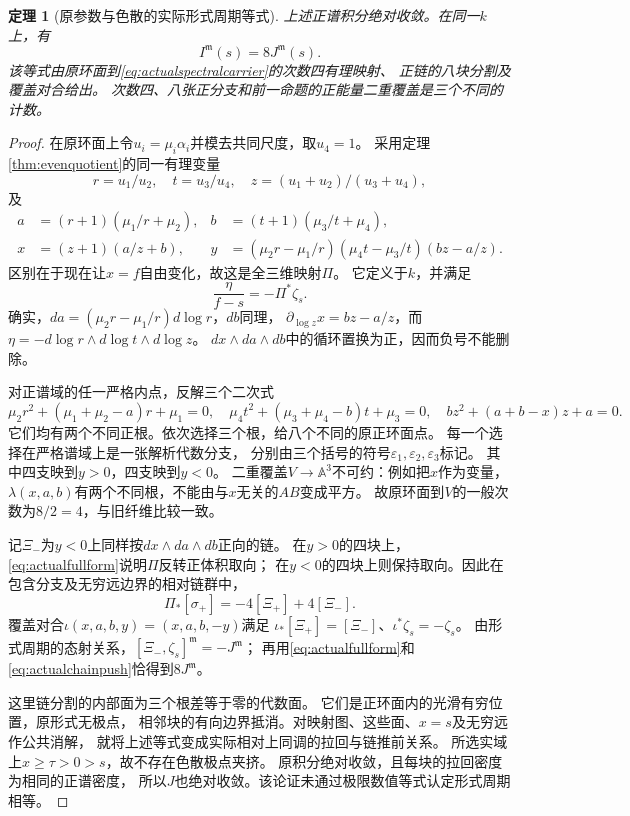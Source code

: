 \documentclass[11pt,a4paper]{ctexart}
\theoremstyle{cnplain}\newtheorem{theorem}{定理}[section]
\theoremstyle{definition}\newtheorem{definition}[theorem]{定义}
\theoremstyle{remark}\newtheorem{remark}[theorem]{注}
\begin{document}
\begin{theorem}[原参数与色散的实际形式周期等式]\label{thm:actualdispersionformal}
上述正谱积分绝对收敛。在同一$k$上，有
\begin{equation}\label{eq:actualeight}
                   I^{\mathfrak m}(s)=8J^{\mathfrak m}(s).
\end{equation}
该等式由原环面到\eqref{eq:actualspectralcarrier}的次数四有理映射、
正链的八块分割及覆盖对合给出。
次数四、八张正分支和前一命题的正能量二重覆盖是三个不同的计数。
\end{theorem}
\begin{proof}
在原环面上令$u_i=\mu_i\alpha_i$并模去共同尺度，取$u_4=1$。
采用定理\ref{thm:evenquotient}的同一有理变量
\[
 r=u_1/u_2,\quad t=u_3/u_4,\quad z=(u_1+u_2)/(u_3+u_4),
\]
及
\begin{align*}
 a&=(r+1)(\mu_1/r+\mu_2),&
 b&=(t+1)(\mu_3/t+\mu_4),\\
 x&=(z+1)(a/z+b),&
 y&=(\mu_2r-\mu_1/r)(\mu_4t-\mu_3/t)(bz-a/z).
\end{align*}
区别在于现在让$x=f$自由变化，故这是全三维映射$\Pi$。
它定义于$k$，并满足
\begin{equation}\label{eq:actualfullform}
             \frac{\eta}{f-s}=-\Pi^*\zeta_s.
\end{equation}
确实，$da=(\mu_2r-\mu_1/r)d\log r$，$db$同理，
$\partial_{\log z}x=bz-a/z$，而
$\eta=-d\log r\wedge d\log t\wedge d\log z$。
$dx\wedge da\wedge db$中的循环置换为正，因而负号不能删除。

对正谱域的任一严格内点，反解三个二次式
\[
 \mu_2r^2+(\mu_1+\mu_2-a)r+\mu_1=0,\quad
 \mu_4t^2+(\mu_3+\mu_4-b)t+\mu_3=0,\quad
 bz^2+(a+b-x)z+a=0.
\]
它们均有两个不同正根。依次选择三个根，给八个不同的原正环面点。
每一个选择在严格谱域上是一张解析代数分支，
分别由三个括号的符号$\varepsilon_1,\varepsilon_2,\varepsilon_3$标记。
其中四支映到$y>0$，四支映到$y<0$。
二重覆盖$V\to\mathbb A^3$不可约：例如把$x$作为变量，
$\lambda(x,a,b)$有两个不同根，不能由与$x$无关的$AB$变成平方。
故原环面到$V$的一般次数为$8/2=4$，与旧纤维比较一致。

记$\Xi_-$为$y<0$上同样按$dx\wedge da\wedge db$正向的链。
在$y>0$的四块上，\eqref{eq:actualfullform}说明$\Pi$反转正体积取向；
在$y<0$的四块上则保持取向。因此在包含分支及无穷远边界的相对链群中，
\begin{equation}\label{eq:actualchainpush}
                 \Pi_*[\sigma_+]=-4[\Xi_+]+4[\Xi_-].
\end{equation}
覆盖对合$\iota(x,a,b,y)=(x,a,b,-y)$满足
$\iota_*[\Xi_+]=[\Xi_-]$、$\iota^*\zeta_s=-\zeta_s$。
由形式周期的态射关系，$[\Xi_-,\zeta_s]^{\mathfrak m}=-J^{\mathfrak m}$；
再用\eqref{eq:actualfullform}和\eqref{eq:actualchainpush}恰得到$8J^{\mathfrak m}$。

这里链分割的内部面为三个根差等于零的代数面。
它们是正环面内的光滑有穷位置，原形式无极点，
相邻块的有向边界抵消。对映射图、这些面、$x=s$及无穷远作公共消解，
就将上述等式变成实际相对上同调的拉回与链推前关系。
所选实域上$x\geq\tau>0>s$，故不存在色散极点夹挤。
原积分绝对收敛，且每块的拉回密度为相同的正谱密度，
所以$J$也绝对收敛。该论证未通过极限数值等式认定形式周期相等。
\end{proof}
\end{document}

